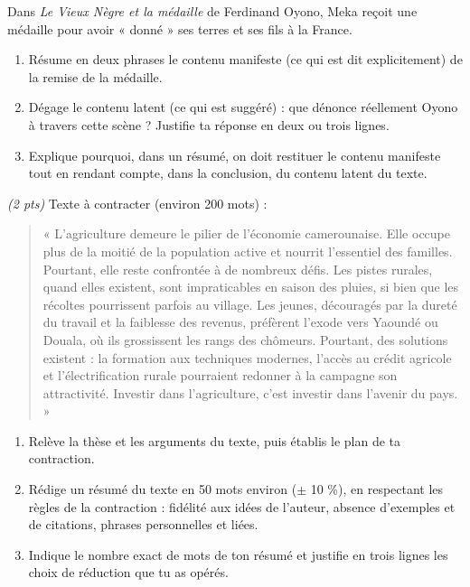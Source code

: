 \documentclass[11pt]{article}
\begin{document}
\begin{exercice}
Dans \textit{Le Vieux Nègre et la médaille} de Ferdinand Oyono, Meka reçoit une médaille pour avoir « donné » ses terres et ses fils à la France.
\begin{enumerate}
\item Résume en deux phrases le contenu manifeste (ce qui est dit explicitement) de la remise de la médaille.
\item Dégage le contenu latent (ce qui est suggéré) : que dénonce réellement Oyono à travers cette scène ? Justifie ta réponse en deux ou trois lignes.
\item Explique pourquoi, dans un résumé, on doit restituer le contenu manifeste tout en rendant compte, dans la conclusion, du contenu latent du texte.
\end{enumerate}
\end{exercice}

\begin{exercice} \hfill \textit{(2 pts)}
Texte à contracter (environ 200 mots) :
\begin{quote}
« L'agriculture demeure le pilier de l'économie camerounaise. Elle occupe plus de la moitié de la population active et nourrit l'essentiel des familles. Pourtant, elle reste confrontée à de nombreux défis. Les pistes rurales, quand elles existent, sont impraticables en saison des pluies, si bien que les récoltes pourrissent parfois au village. Les jeunes, découragés par la dureté du travail et la faiblesse des revenus, préfèrent l'exode vers Yaoundé ou Douala, où ils grossissent les rangs des chômeurs. Pourtant, des solutions existent : la formation aux techniques modernes, l'accès au crédit agricole et l'électrification rurale pourraient redonner à la campagne son attractivité. Investir dans l'agriculture, c'est investir dans l'avenir du pays. »
\end{quote}
\begin{enumerate}
\item Relève la thèse et les arguments du texte, puis établis le plan de ta contraction.
\item Rédige un résumé du texte en 50 mots environ ($\pm$ 10 \%), en respectant les règles de la contraction : fidélité aux idées de l'auteur, absence d'exemples et de citations, phrases personnelles et liées.
\item Indique le nombre exact de mots de ton résumé et justifie en trois lignes les choix de réduction que tu as opérés.
\end{enumerate}
\end{exercice}
\end{document}

